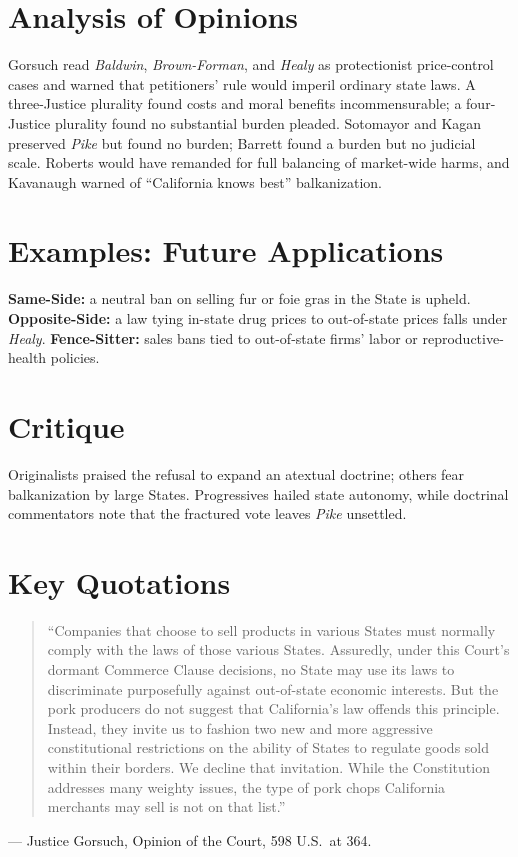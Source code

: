 \documentclass[12pt]{article}
\begin{document}
\section{Analysis of Opinions}
Gorsuch read \textit{Baldwin}, \textit{Brown-Forman}, and \textit{Healy} as protectionist price-control cases and warned that petitioners' rule would imperil ordinary state laws. A three-Justice plurality found costs and moral benefits incommensurable; a four-Justice plurality found no substantial burden pleaded. Sotomayor and Kagan preserved \textit{Pike} but found no burden; Barrett found a burden but no judicial scale. Roberts would have remanded for full balancing of market-wide harms, and Kavanaugh warned of ``California knows best'' balkanization.

\section{Examples: Future Applications}
\textbf{Same-Side:} a neutral ban on selling fur or foie gras in the State is upheld. \textbf{Opposite-Side:} a law tying in-state drug prices to out-of-state prices falls under \textit{Healy}. \textbf{Fence-Sitter:} sales bans tied to out-of-state firms' labor or reproductive-health policies.

\section{Critique}
Originalists praised the refusal to expand an atextual doctrine; others fear balkanization by large States. Progressives hailed state autonomy, while doctrinal commentators note that the fractured vote leaves \textit{Pike} unsettled.

\section{Key Quotations}
\begin{quote}
``Companies that choose to sell products in various States must normally comply with the laws of those various States. Assuredly, under this Court's dormant Commerce Clause decisions, no State may use its laws to discriminate purposefully against out-of-state economic interests. But the pork producers do not suggest that California's law offends this principle. Instead, they invite us to fashion two new and more aggressive constitutional restrictions on the ability of States to regulate goods sold within their borders. We decline that invitation. While the Constitution addresses many weighty issues, the type of pork chops California merchants may sell is not on that list.''
\end{quote}
\noindent --- Justice Gorsuch, Opinion of the Court, 598 U.S.\ at 364.
\end{document}
